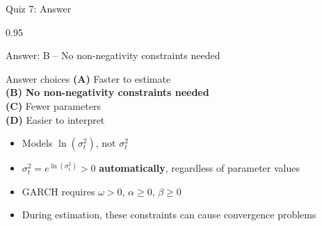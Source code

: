 \documentclass[9pt, aspectratio=169, t]{beamer}
\begin{document}
\begin{frame}{Quiz 7: Answer}
    \begin{cminipage}{0.95\textwidth}
    \begin{exampleblock}{Answer: B -- No non-negativity constraints needed}

    \vspace{0.1cm}

    \begin{block}{Answer choices}
        \textcolor{MainBlue}{\textbf{(A)}} Faster to estimate \incorrect\\[3pt]
        \textcolor{MainBlue}{\textbf{(B)}} \textbf{\textcolor{Forest}{No non-negativity constraints needed}} \correct\\[3pt]
        \textcolor{MainBlue}{\textbf{(C)}} Fewer parameters \incorrect\\[3pt]
        \textcolor{MainBlue}{\textbf{(D)}} Easier to interpret \incorrect
    \end{block}

        \vspace{0.1cm}

        \begin{itemize}
            \item Models $\ln(\sigma_t^2)$, not $\sigma_t^2$
            \item $\sigma_t^2 = e^{\ln(\sigma_t^2)} > 0$ \textbf{automatically}, regardless of parameter values
            \item GARCH requires $\omega > 0$, $\alpha \geq 0$, $\beta \geq 0$
            \item During estimation, these constraints can cause convergence problems
        \end{itemize}
    \end{exampleblock}

    \end{cminipage}
\end{frame}
\end{document}

